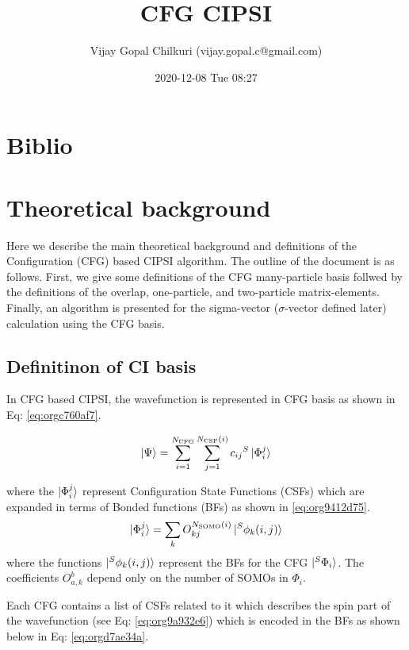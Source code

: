 \documentclass[11pt]{article}
\author{Vijay Gopal Chilkuri (vijay.gopal.c@gmail.com)}
\date{2020-12-08 Tue 08:27}
\title{CFG CIPSI}
\begin{document}
\maketitle
\tableofcontents


\section{Biblio}
\label{sec:org471cc15}
\section{Theoretical background}
\label{sec:org2af35e7}

Here we describe the main theoretical background and definitions of the
Configuration (CFG) based CIPSI algorithm. The outline of the document is as follows.
First, we give some definitions of the CFG many-particle basis follwed by the
definitions of the overlap, one-particle, and two-particle matrix-elements. Finally,
an algorithm is presented for the sigma-vector (\(\sigma\)-vector defined later) calculation using
the CFG basis.


\subsection{Definitinon of CI basis}
\label{sec:org9ec07e3}

In CFG based CIPSI, the wavefunction is represented in CFG basis
as shown in Eq: \ref{eq:orgc760af7}.

\newcommand{\Ncfg}{N_{\text{CFG}}}
\newcommand{\Ncsf}{N_{\text{CSF}}}
\newcommand{\Nsomo}{N_{\text{SOMO}}}
\begin{equation}
\label{eq:orgc760af7}
\ket{\Psi} = \sum_{i=1}^{\Ncfg} \sum_{j=1}^{\Ncsf(i)} c_{ij} {^S\ket{\Phi^j_i}}
\end{equation}


where the \(\ket{\Phi^j_i}\) represent Configuration State Functions (CSFs)
which are expanded in terms of Bonded functions (BFs) as shown in
\ref{eq:org9412d75}.
\begin{equation}
\label{eq:org9412d75}
\ket{\Phi^j_i} = \sum_k O^{\Nsomo(i)}_{kj} \ket{^S\phi_k(i,j)}
\end{equation}
where the functions \(\ket{^S\phi_k(i,j)}\) represent the BFs for the CFG
\(\ket{^S\Phi_i}\).
The coefficients \(O^b_{a,k}\) depend only on the number of SOMOs
in \(\Phi_i\).

Each CFG contains a list of CSFs related to it which describes the
spin part of the wavefunction (see Eq: \ref{eq:org9a932e6}) which is
encoded in the BFs as shown below in Eq: \ref{eq:orgd7ae34a}.
\end{document}
